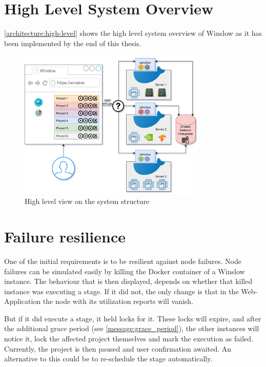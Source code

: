\section{High Level System Overview}


\autoref{architecture:high-level} shows the high level system overview of Winslow as it has been implemented by the end of this thesis.

\begin{figure}[h]
	\centering
	\includegraphics[width=0.8\textwidth]{architecture.png}
	\caption{High level view on the system structure}
	\label{architecture:high-level}
\end{figure}



\section{Failure resilience}


One of the initial requirements is to be resilient against node failures.
Node failures can be simulated easily by killing the Docker container of a Winslow instance.
The behaviour that is then displayed, depends on whether that killed instance was executing a stage.
If it did not, the only change is that in the Web-Application the node with its utilization reports will vanish.

But if it did execute a stage, it held locks for it.
These locks will expire, and after the additional grace period (see \autoref{message:grace_period}), the other instances will notice it, lock the affected project themselves and mark the execution as failed.
Currently, the project is then paused and user confirmation awaited.
An alternative to this could be to re-schedule the stage automatically.